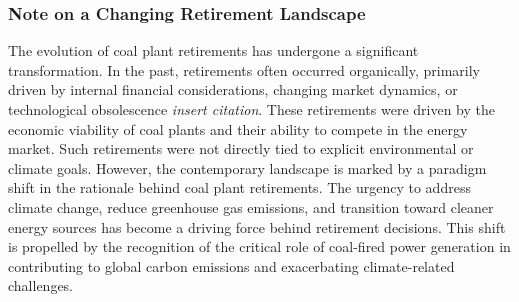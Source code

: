 \subsubsection{Note on a Changing Retirement Landscape}\label{subsec:changing-retirement-landscape}


The evolution of coal plant retirements has undergone a significant transformation. 
In the past, retirements often occurred organically, primarily driven by internal financial considerations, 
changing market dynamics, or technological obsolescence \textit{insert citation}. 
These retirements were driven by the economic viability of coal plants and their ability to compete 
in the energy market. Such retirements were not directly tied to explicit environmental or climate goals. 
However, the contemporary landscape is marked by a paradigm shift in the rationale behind coal plant retirements. 
The urgency to address climate change, reduce greenhouse gas emissions, and transition toward cleaner energy 
sources has become a driving force behind retirement decisions. This shift is propelled by the recognition of 
the critical role of coal-fired power generation in contributing to global carbon emissions and exacerbating 
climate-related challenges.


